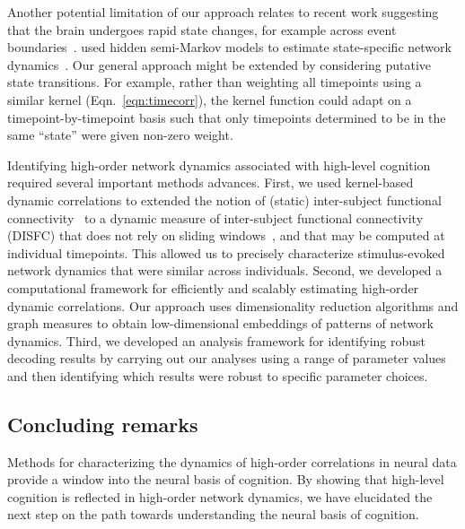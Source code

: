 \documentclass[english]{article}
\begin{document}
Another potential limitation of our approach relates to recent work
suggesting that the brain undergoes rapid state changes, for example
across event boundaries~\citep[e.g.,][]{BaldEtal17}.
\cite{ShapEtal19} used hidden semi-Markov models to estimate
state-specific network dynamics~\citep[also see][]{VidaEtal18}.  Our
general approach might be extended by considering putative state
transitions. For example, rather than weighting all timepoints using a
similar kernel (Eqn.~\ref{eqn:timecorr}), the kernel function could
adapt on a timepoint-by-timepoint basis such that only timepoints
determined to be in the same ``state'' were given non-zero weight.

Identifying high-order network dynamics associated with high-level
cognition required several important methods advances.  First, we used
kernel-based dynamic correlations to extended the notion of (static)
inter-subject functional connectivity~\citep{SimoEtal16} to a dynamic
measure of inter-subject functional connectivity (DISFC) that does not
rely on sliding windows~\citep[e.g., as in][]{MannEtal18}, and that
may be computed at individual timepoints.  This allowed us to
precisely characterize stimulus-evoked network dynamics that were
similar across individuals.  Second, we developed a computational
framework for efficiently and scalably estimating high-order dynamic
correlations.  Our approach uses dimensionality reduction algorithms
and graph measures to obtain low-dimensional embeddings of patterns of
network dynamics.  Third, we developed an analysis framework for
identifying robust decoding results by carrying out our analyses using
a range of parameter values and then identifying which results were
robust to specific parameter choices.

\subsection*{Concluding remarks}
Methods for characterizing the dynamics of high-order correlations in
neural data provide a window into the neural basis of cognition.  By
showing that high-level cognition is reflected in high-order network
dynamics, we have elucidated the next step on the path towards
understanding the neural basis of cognition.
\end{document}
